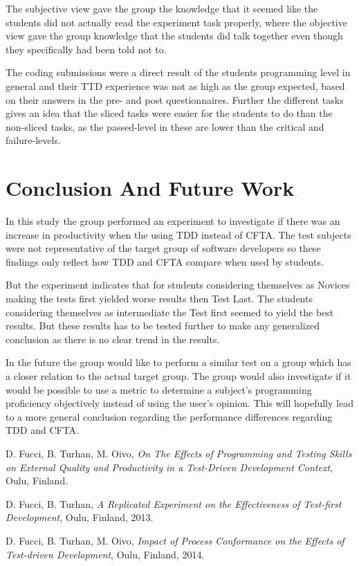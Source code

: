 \documentclass{sig-alternate-05-2015}
\begin{document}
The subjective view gave the group the knowledge that it seemed like the students did not actually read the experiment task properly, where the objective view gave the group knowledge that the students did talk together even though they specifically had been told not to.

The coding submissions were a direct result of the students programming level in general and their TTD experience was not as high as the group expected, based on their answers in the pre- and post questionnaires. Further the different tasks gives an idea that the sliced tasks were easier for the students to do than the non-sliced tasks, as the passed-level in these are lower than the critical and failure-levels.

\section{Conclusion And Future Work}
In this study the group performed an experiment to investigate if there was an increase in productivity when the using TDD instead of CFTA. The test subjects were not representative of the target group of software developers so these findings only reflect how TDD and CFTA compare when used by students. 

But the experiment indicates that for students considering themselves as Novices making the tests first yielded worse results then Test Last. The students considering themselves as intermediate the Test first seemed to yield the best results. But these results has to be tested further to make any generalized conclusion as there is no clear trend in the results.

In the future the group would like to perform a similar test on a group which has a closer relation to the actual target group. The group would also investigate if it would be possible to use a metric to determine a subject's programming proficiency objectively instead of using the user's opinion. This will hopefully lead to a more general conclusion regarding the performance differences regarding TDD and CFTA.

\begin{thebibliography}{3}

  D. Fucci, B. Turhan, M. Oivo,
  \emph{On The Effects of Programming and Testing Skills on External Quality and Productivity in a Test-Driven Development Context},
  Oulu, Finland.
  
  D. Fucci, B. Turhan,
  \emph{A Replicated Experiment on the Effectiveness of Test-first Development},
  Oulu, Finland,
  2013.
  
  D. Fucci, B. Turhan, M. Oivo,
  \emph{Impact of Process Conformance on the Effects of Test-driven Development},
  Oulu, Finland,
  2014.

\end{thebibliography}
\end{document}
